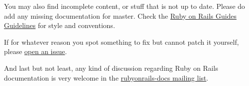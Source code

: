 \documentclass[10pt]{book}
\begin{document}
           You may also find incomplete content, or stuff that is not up to date.           Please do add any missing documentation for master. Check the           \href{http://guides.rubyonrails.org/ruby_on_rails_guides_guidelines.html}{Ruby on Rails Guides Guidelines}           for style and conventions.         

           If for whatever reason you spot something to fix but cannot patch it yourself, please           \href{https://github.com/rails/rails/issues}{open an issue}.         

And last but not least, any kind of discussion regarding Ruby on Rails           documentation is very welcome in the \href{http://groups.google.com/group/rubyonrails-docs}{rubyonrails-docs mailing list}.


\tableofcontents
\end{document}
